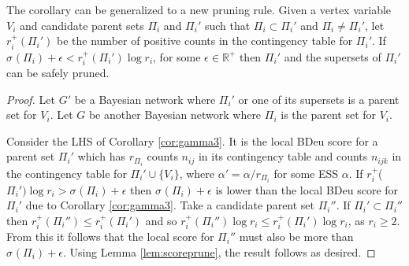 \documentclass[letterpaper]{article}
\newcommand{\score}[2]{\sigma_{#1}({#2})}
\newenvironment{customthm}[1]
  {\renewcommand\theinnercustomthm{#1}\innercustomthm}
  {\endinnercustomthm}
\begin{document}
 
 The corollary can be generalized to a new pruning rule.
\begin{customthm}{6}
Given a vertex variable $V_i$ and candidate parent sets $\Pi_i$ and $\Pi_i'$ such that $\Pi_i \subset \Pi_i'$ and $\Pi_i \neq \Pi_i'$, let
$r_i^{+}(\Pi_i')$ be the number of positive counts in the contingency table for $\Pi_i'$. If $\score{}{\Pi_i} + \epsilon < r_i^{+}(\Pi_i') \log r_i$, for some $\epsilon \in \mathbb{R^+}$ then $\Pi_i'$ and the supersets of $\Pi_i'$ can be safely pruned.
\label{thm:jamesrelaxed}
\end{customthm}

\begin{proof}
 Let $G'$ be a Bayesian network where $\Pi_i'$ or one of its supersets is a parent set for $V_i$.  Let $G$ be another Bayesian network where $\Pi_i$ is the parent set for $V_i$. 
 
Consider the LHS of Corollary \ref{cor:gamma3}. It is the local BDeu score for a parent set $\Pi_i'$ which has $r_{\Pi_i}$ counts $n_{ij}$ in its contingency table and counts $n_{ijk}$ in the contingency table for $\Pi_i' \cup \{V_i\}$, where $\alpha' = \alpha/r_{\Pi_i}$ for some ESS $\alpha$. If $r_i^{+}$($\Pi_i') \log r_i > \score{}{\Pi_i} + \epsilon$ then $\score{}{\Pi_i} + \epsilon$ is
lower than the local BDeu score for $\Pi_i'$ due to Corollary \ref{cor:gamma3}. Take a candidate parent set $\Pi_i''$. If $\Pi_i' \subset \Pi_i''$ then $r_i^{+}(\Pi_i'')  \leq r_i^{+}(\Pi_i')$ and so $r_i^{+}(\Pi_i'') \log r_i \leq r_i^{+}(\Pi_i') \log r_i$, as $r_i \geq 2$. From this
it follows that the local score for $\Pi_i''$ must also be more than $\score{}{\Pi_i} + \epsilon $. Using Lemma \ref{lem:scoreprune}, the result follows as desired.
\end{proof}
\end{document}
